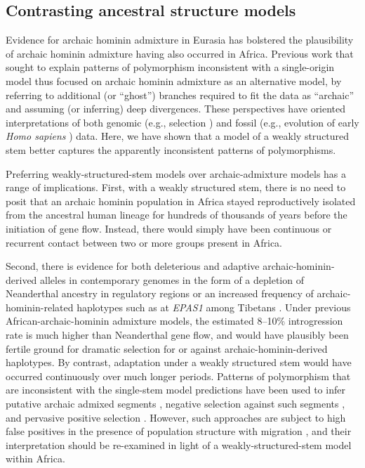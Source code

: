 \documentclass[]{article}
\begin{document}
\subsection*{Contrasting ancestral structure models}

Evidence for archaic hominin admixture in Eurasia has bolstered the
plausibility of archaic hominin admixture having also occurred in Africa.
Previous work that sought to explain patterns of polymorphism inconsistent with
a single-origin model thus focused on archaic hominin admixture as an
alternative model, by referring to additional (or ``ghost'') branches required
to fit the data as ``archaic'' \citep{Plagnol2006-lt,Hammer2011-bx,
Hey2018-pw,Ragsdale2019-nt,Lorente-Galdos2019-vz, Durvasula2020-td} and
assuming (or inferring) deep divergences. These perspectives have oriented
interpretations of both genomic (e.g., selection \cite{Wall2019-ao}) and fossil
(e.g., evolution of early \emph{Homo sapiens} \cite{Grun2020-su}) data. Here,
we have shown that a model of a weakly structured stem better captures the
apparently inconsistent patterns of polymorphisms.

Preferring weakly-structured-stem models over archaic-admixture models has a
range of implications. First, with a weakly structured stem, there is no need
to posit that an archaic hominin population in Africa stayed reproductively
isolated from the ancestral human lineage for hundreds of thousands of years
before the initiation of gene flow. Instead, there would simply have been
continuous or recurrent contact between two or more groups present in Africa.

Second, there is evidence for both deleterious and adaptive
archaic-hominin-derived alleles in contemporary genomes in the form of a
depletion of Neanderthal ancestry in regulatory regions \citep{Petr2019-xo} or
an increased frequency of archaic-hominin-related haplotypes such as at
\emph{EPAS1} among Tibetans \citep{Zhang2021-xx}. Under previous
African-archaic-hominin admixture models, the estimated 8--10\% introgression
rate is much higher than Neanderthal gene flow, and would have plausibly been
fertile ground for dramatic selection for or against archaic-hominin-derived
haplotypes\citep{Wall2019-ao}. By contrast, adaptation under a weakly
structured stem would have occurred continuously over much longer periods.
Patterns of polymorphism that are inconsistent with the single-stem model
predictions have been used to infer putative archaic admixed segments
\citep{Plagnol2006-lt,Hsieh2016-gk,Wall2019-ao,Durvasula2020-td}, negative
selection against such segments \citep{Wall2019-ao}, and pervasive positive
selection \citep{Schrider2017-kl}. However, such approaches are subject to high
false positives in the presence of population structure with migration
\citep{Petr2019-xo}, and their interpretation should be re-examined in light of
a weakly-structured-stem model within Africa. 
\end{document}
